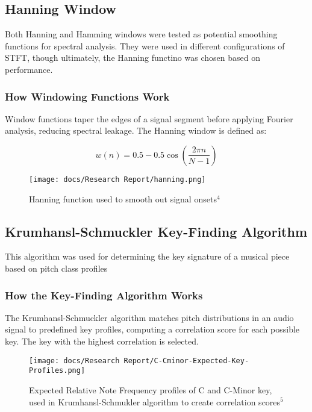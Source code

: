 \documentclass{article}
\begin{document}
\newpage

\subsection{Hanning Window}
Both Hanning and Hamming windows were tested as potential smoothing functions for spectral analysis. They were used in different configurations of STFT, though ultimately, the Hanning functino was chosen based on performance.

\subsubsection{How Windowing Functions Work}
Window functions taper the edges of a signal segment before applying Fourier analysis, reducing spectral leakage. The Hanning window is defined as:

\begin{equation}
w(n) = 0.5 - 0.5\cos\left(\frac{2\pi n}{N-1}\right)
\end{equation}

\begin{figure}[h]
\texttt{[image: docs/Research Report/hanning.png]}
\caption{Hanning function used to smooth out signal onsets$^4$}
\end{figure}

\newpage

\subsection{Krumhansl-Schmuckler Key-Finding Algorithm}
This algorithm was used for determining the key signature of a musical piece based on pitch class profiles 

\subsubsection{How the Key-Finding Algorithm Works}
The Krumhansl-Schmuckler algorithm matches pitch distributions in an audio signal to predefined key profiles, computing a correlation score for each possible key. The key with the highest correlation is selected.

\begin{figure}[h]
\texttt{[image: docs/Research Report/C-Cminor-Expected-Key-Profiles.png]}
\caption{Expected Relative Note Frequency profiles of C and C-Minor key, used in Krumhansl-Schmukler algorithm to create correlation scores$^5$}
\end{figure}
\end{document}
